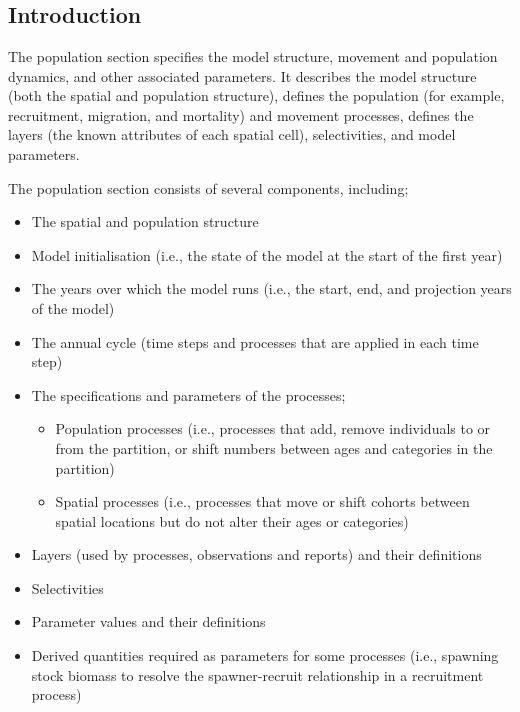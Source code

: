 \section{\label{sec:population-section}}

\subsection{Introduction}

The population section specifies the model structure, movement and population dynamics, and other associated parameters. It describes the model structure (both the spatial and population structure), defines the population  (for example, recruitment, migration, and mortality) and movement processes, defines the layers (the known attributes of each spatial cell), selectivities, and model parameters.

The population section consists of several components, including;
\begin{itemize}
  \item The spatial and population structure
  \item Model initialisation (i.e., the state of the model at the start of the first year)
  \item The years over which the model runs (i.e., the start, end, and projection years of the model)
  \item The annual cycle (time steps and processes that are applied in each time step)
  \item The specifications and parameters of the processes;
  \begin{itemize}
    \item Population processes (i.e., processes that add, remove individuals to or from the partition, or shift numbers between ages and categories in the partition)
    \item Spatial processes (i.e., processes that move or shift cohorts between spatial locations but do not alter their ages or categories)
  \end{itemize}
  \item Layers (used by processes, observations and reports) and their definitions
  \item Selectivities
  \item Parameter values and their definitions
  \item Derived quantities required as parameters for some processes (i.e., spawning stock biomass to resolve the spawner-recruit relationship in a recruitment process)
\end{itemize}

